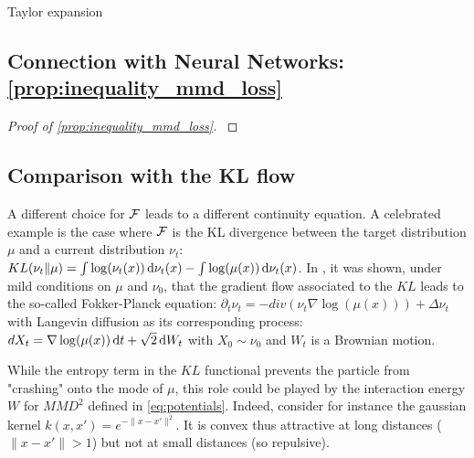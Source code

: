 \begin{lemma}
\label{lem:Taylor-expansion}Taylor expansion
\end{lemma}



\subsection{Connection with Neural Networks: \cref{prop:inequality_mmd_loss}}

\begin{proof}[Proof of \cref{prop:inequality_mmd_loss}]\label{proof:prop:inequality_mmd_loss}
\end{proof}

\subsection{Comparison with the KL flow}\label{subsec:kl_flow}

	A different choice for ${{\mathcal F}}$  leads to a different continuity equation. A celebrated example is the case where ${{\mathcal F}}$ is the KL divergence between the target distribution $\mu$ and a current distribution $\nu_t$: $KL(\nu_t\Vert \mu ) =  \int \log (\nu_t(x))\mathop{}\!\mathrm{d} \nu_t(x) -\int \log(\mu(x))\mathop{}\!\mathrm{d} \nu_t(x)$. In \cite{jordan1998variational}, it was shown, under mild conditions on $\mu$ and $\nu_0$, that the gradient flow associated to the $KL$ leads to the so-called Fokker-Planck equation: $ \partial_t \nu_t = - div(\nu_t \nabla \log(\mu(x))) + \Delta \nu_t $ with Langevin diffusion as its corresponding process: $d X_t = \nabla \log(\mu(x))\mathop{}\!\mathrm{d} t + \sqrt{2} \mathop{}\!\mathrm{d} W_t $ with $X_0\sim \nu_0$ and $W_t$ is a Brownian motion.
	
	While the entropy term in the $KL$ functional prevents the particle from "crashing" onto the mode of $\mu$, this role could be played by the interaction energy $W$ for $MMD^2$ defined in \cref{eq:potentials}. Indeed, consider for instance the gaussian kernel $k(x,x')=e^{-\|x-x'\|^2}$. It is convex thus attractive at long distances ($\|x-x'\|>1$) but not at small distances (so repulsive).
	
